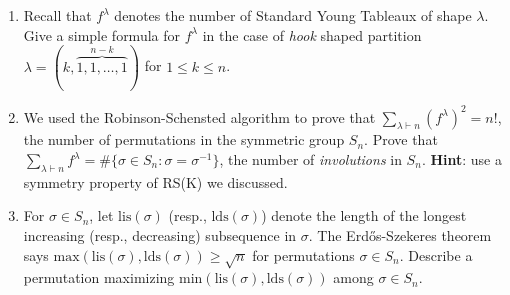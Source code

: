 \documentclass[11pt]{article}
\begin{document}
\begin{enumerate}
\item Recall that $f^{\lambda}$ denotes the number of Standard Young Tableaux of shape $\lambda$. Give a simple formula for $f^{\lambda}$ in the case of \emph{hook} shaped partition $\lambda = (k,\overbrace{1,1,\ldots,1}^{n-k})$ for $1\leq k \leq n$. 

\item We used the Robinson-Schensted algorithm to prove that $\sum_{\lambda \vdash n} (f^{\lambda})^2 = n!$, the number of permutations in the symmetric group $S_n$. Prove that $\sum_{\lambda \vdash n} f^{\lambda} = \#\{\sigma \in S_n \colon \sigma=\sigma^{-1}\}$, the number of \emph{involutions} in $S_n$. {\bf Hint}: use a symmetry property of RS(K) we discussed.

\item For $\sigma\in S_n$, let $\mathrm{lis}(\sigma)$ (resp., $\mathrm{lds}(\sigma)$) denote the length of the longest increasing (resp., decreasing) subsequence in $\sigma$. The Erd\H{o}s-Szekeres theorem says $\mathrm{max}(\mathrm{lis}(\sigma), \mathrm{lds}(\sigma)) \geq \sqrt{n}$ for permutations $\sigma\in S_n$. Describe a permutation maximizing $\mathrm{min}(\mathrm{lis}(\sigma), \mathrm{lds}(\sigma))$ among  $\sigma \in S_n$.

\end{enumerate}
\end{document}
